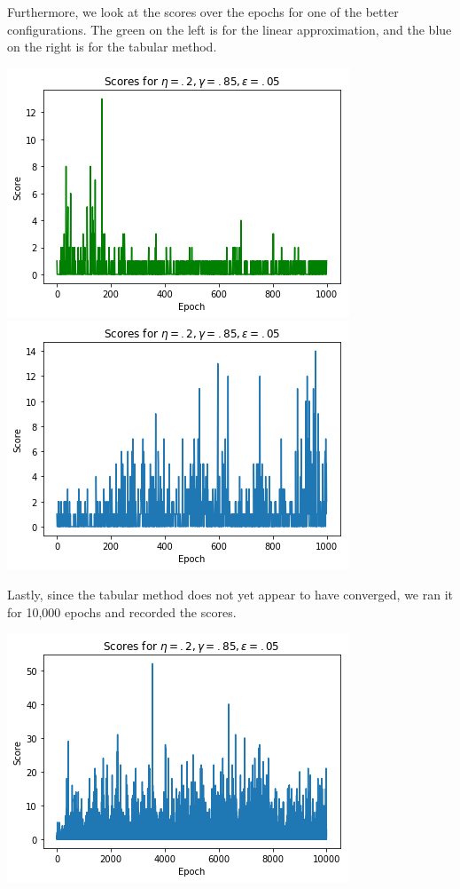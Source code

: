 \documentclass[11pt]{article}
\begin{document}
Furthermore, we look at the scores over the epochs for one of the better configurations. The green on the left is for the linear approximation, and the blue on the right is for the tabular method.
\begin{center}
    \includegraphics[scale=.5]{fun-scores.png}
    \includegraphics[scale=.5]{score-over-epochs.png}
\end{center}

Lastly, since the tabular method does not yet appear to have converged, we ran it for 10,000 epochs and recorded the scores.
\begin{center}
\includegraphics[scale =.5]{long-scores.png}
\end{center}
\end{document}
